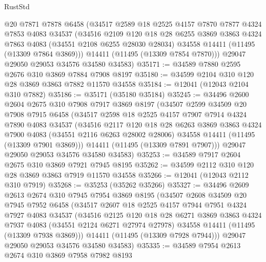 \begin{lexlean}{RustStd}
\begin{coremodule}
      @20
      @7871
      @7878
      @6458
      (@34517
        @2589
        @18
        @2525
        @4157
        @7870
        @7877
        @4324
        @7853
        @4083
        @34537
        (@34516
          @2109
          @120
          @18
          @28
          @6255
          @3869
          @3863
          @4324
          @7863
          @4083
          (@34551 @2108 @6255 @28030 @28034)
          @34558
          @14411
          (@11495 (@13309 @7864 @3869)))
        @14411
        (@11495 (@13309 @7854 @7870)))
      @29047
      @29050
      @29053
      @34576
      @34580
      @34583)
@35171 := @34589 @7880 @2595 @2676 @310 @3869 @7884 @7908 @8197
@35180 := @34599 @2104 @310 @120 @28 @3869 @3863 @7882 @11570 @34558
@35184 := @12041 (@12043 @2104 @310 @7882)
@35186 := @35171 (@35180 @35184)
@35245 := @34496
    @2600
    @2604
    @2675
    @310
    @7908
    @7917
    @3869
    @8197
    (@34507
      @2599
      @34509
      @20
      @7908
      @7915
      @6458
      (@34517
        @2598
        @18
        @2525
        @4157
        @7907
        @7914
        @4324
        @7890
        @4083
        @34537
        (@34516
          @2117
          @120
          @18
          @28
          @6263
          @3869
          @3863
          @4324
          @7900
          @4083
          (@34551 @2116 @6263 @28002 @28006)
          @34558
          @14411
          (@11495 (@13309 @7901 @3869)))
        @14411
        (@11495 (@13309 @7891 @7907)))
      @29047
      @29050
      @29053
      @34576
      @34580
      @34583)
@35253 := @34589 @7917 @2604 @2675 @310 @3869 @7921 @7945 @8195
@35262 := @34599 @2112 @310 @120 @28 @3869 @3863 @7919 @11570 @34558
@35266 := @12041 (@12043 @2112 @310 @7919)
@35268 := @35253 (@35262 @35266)
@35327 := @34496
    @2609
    @2613
    @2674
    @310
    @7945
    @7954
    @3869
    @8195
    (@34507
      @2608
      @34509
      @20
      @7945
      @7952
      @6458
      (@34517
        @2607
        @18
        @2525
        @4157
        @7944
        @7951
        @4324
        @7927
        @4083
        @34537
        (@34516
          @2125
          @120
          @18
          @28
          @6271
          @3869
          @3863
          @4324
          @7937
          @4083
          (@34551 @2124 @6271 @27974 @27978)
          @34558
          @14411
          (@11495 (@13309 @7938 @3869)))
        @14411
        (@11495 (@13309 @7928 @7944)))
      @29047
      @29050
      @29053
      @34576
      @34580
      @34583)
@35335 := @34589 @7954 @2613 @2674 @310 @3869 @7958 @7982 @8193

\end{coremodule}
\end{lexlean}
